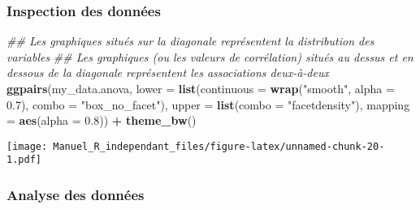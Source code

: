 \documentclass[
]{book}
\newenvironment{Shaded}{\begin{snugshade}}{\end{snugshade}}
\newcommand{\CommentTok}[1]{\textcolor[rgb]{0.56,0.35,0.01}{\textit{#1}}}
\newcommand{\DataTypeTok}[1]{\textcolor[rgb]{0.13,0.29,0.53}{#1}}
\newcommand{\FloatTok}[1]{\textcolor[rgb]{0.00,0.00,0.81}{#1}}
\newcommand{\KeywordTok}[1]{\textcolor[rgb]{0.13,0.29,0.53}{\textbf{#1}}}
\newcommand{\NormalTok}[1]{#1}
\newcommand{\OperatorTok}[1]{\textcolor[rgb]{0.81,0.36,0.00}{\textbf{#1}}}
\newcommand{\StringTok}[1]{\textcolor[rgb]{0.31,0.60,0.02}{#1}}
\begin{document}
\hypertarget{inspection-des-donnuxe9es}{%
\subsubsection{Inspection des données}\label{inspection-des-donnuxe9es}}

\begin{Shaded}
\begin{Highlighting}[]
\CommentTok{## Les graphiques situés sur la diagonale représentent la distribution des variables}
\CommentTok{## Les graphiques (ou les valeurs de corrélation) situés au dessus et en dessous de la diagonale représentent les associations deux-à-deux}
\KeywordTok{ggpairs}\NormalTok{(my_data.anova,}
        \DataTypeTok{lower =} \KeywordTok{list}\NormalTok{(}\DataTypeTok{continuous =} \KeywordTok{wrap}\NormalTok{(}\StringTok{"smooth"}\NormalTok{, }\DataTypeTok{alpha =} \FloatTok{0.7}\NormalTok{), }\DataTypeTok{combo =} \StringTok{"box_no_facet"}\NormalTok{),}
        \DataTypeTok{upper =} \KeywordTok{list}\NormalTok{(}\DataTypeTok{combo =} \StringTok{"facetdensity"}\NormalTok{), }
        \DataTypeTok{mapping =} \KeywordTok{aes}\NormalTok{(}\DataTypeTok{alpha =} \FloatTok{0.8}\NormalTok{)) }\OperatorTok{+}\StringTok{ }\KeywordTok{theme_bw}\NormalTok{()}
\end{Highlighting}
\end{Shaded}

\texttt{[image: Manuel\_R\_independant\_files/figure-latex/unnamed-chunk-20-1.pdf]}

\hypertarget{analyse-des-donnuxe9es-1}{%
\subsubsection{Analyse des données}\label{analyse-des-donnuxe9es-1}}
\end{document}

